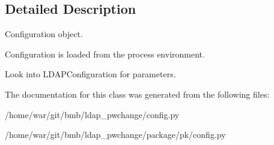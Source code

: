 \subsection{Detailed Description}
\begin{DoxyVerb}Configuration object.

    Configuration is loaded from the process environment.
    
    Look into LDAPConfiguration for parameters.\end{DoxyVerb}
 

The documentation for this class was generated from the following files\-:\begin{DoxyCompactItemize}
\item 
/home/war/git/bmb/ldap\-\_\-pwchange/config.\-py\item 
/home/war/git/bmb/ldap\-\_\-pwchange/package/pk/config.\-py\end{DoxyCompactItemize}
